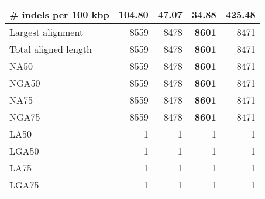 \documentclass[12pt,a4paper]{article}
\begin{document}
\begin{table}[ht]
\begin{center}
\begin{tabular}{|l*{4}{|r}|}
\# indels per 100 kbp & 104.80 & 47.07 & {\bf 34.88} & 425.48 \\ \hline
Largest alignment & 8559 & 8478 & {\bf 8601} & 8471 \\ \hline
Total aligned length & 8559 & 8478 & {\bf 8601} & 8471 \\ \hline
NA50 & 8559 & 8478 & {\bf 8601} & 8471 \\ \hline
NGA50 & 8559 & 8478 & {\bf 8601} & 8471 \\ \hline
NA75 & 8559 & 8478 & {\bf 8601} & 8471 \\ \hline
NGA75 & 8559 & 8478 & {\bf 8601} & 8471 \\ \hline
LA50 & 1 & 1 & 1 & 1 \\ \hline
LGA50 & 1 & 1 & 1 & 1 \\ \hline
LA75 & 1 & 1 & 1 & 1 \\ \hline
LGA75 & 1 & 1 & 1 & 1 \\ \hline
\end{tabular}
\end{center}
\end{table}
\end{document}
